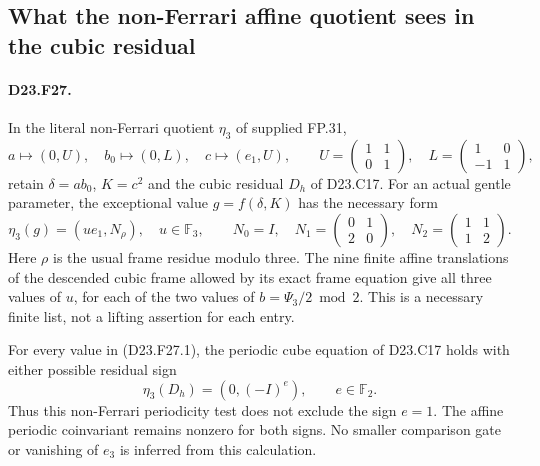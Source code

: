 \subsection{What the non-Ferrari affine quotient sees in the cubic residual}

\paragraph{D23.F27.}
In the literal non-Ferrari quotient $\eta_3$ of supplied FP.31,
\[
 a\mapsto(0,U),\quad b_0\mapsto(0,L),\quad
 c\mapsto(e_1,U),\qquad
 U=\begin{pmatrix}1&1\\0&1\end{pmatrix},\quad
 L=\begin{pmatrix}1&0\\-1&1\end{pmatrix},
\]
retain $\delta=ab_0$, $K=c^2$ and the cubic residual $D_h$ of
D23.C17.  For an actual gentle parameter, the exceptional value
$g=f(\delta,K)$ has the necessary form
\[
 \eta_3(g)=(u e_1,N_\rho),\quad u\in\mathbb F_3,\qquad
 N_0=I,\quad N_1=\begin{pmatrix}0&1\\2&0\end{pmatrix},\quad
 N_2=\begin{pmatrix}1&1\\1&2\end{pmatrix}.
\tag{D23.F27.1}
\]
Here $\rho$ is the usual frame residue modulo three.
The nine finite affine translations of the descended cubic
frame allowed by its exact frame equation give all three
values of $u$, for each of the two values of $b=\Psi_3/2\bmod2$.
This is a necessary finite list, not a lifting assertion for
each entry.

For every value in (D23.F27.1), the periodic cube equation
of D23.C17 holds with either possible residual sign
\[
          \eta_3(D_h)=(0,(-I)^e),\qquad e\in\mathbb F_2.
\tag{D23.F27.2}
\]
Thus this non-Ferrari periodicity test does not exclude the
sign $e=1$.  The affine periodic coinvariant remains nonzero
for both signs.  No smaller comparison gate or vanishing of
$e_3$ is inferred from this calculation.

